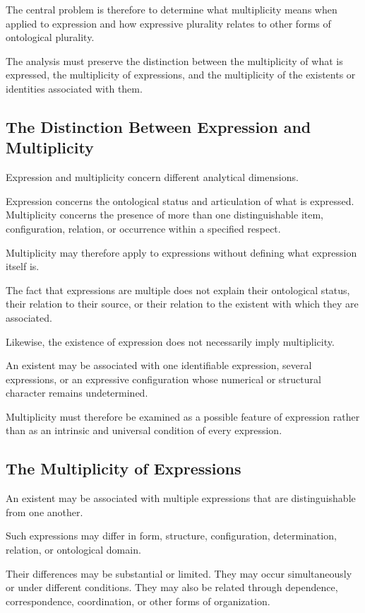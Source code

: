 The central problem is therefore to determine
what multiplicity means when applied to expression
and how expressive plurality relates to other
forms of ontological plurality.

The analysis must preserve the distinction between
the multiplicity of what is expressed, the multiplicity
of expressions, and the multiplicity of the existents
or identities associated with them.

\subsection{The Distinction Between Expression and Multiplicity}

Expression and multiplicity concern different
analytical dimensions.

Expression concerns the ontological status and
articulation of what is expressed. Multiplicity
concerns the presence of more than one distinguishable
item, configuration, relation, or occurrence
within a specified respect.

Multiplicity may therefore apply to expressions
without defining what expression itself is.

The fact that expressions are multiple does not
explain their ontological status, their relation
to their source, or their relation to the existent
with which they are associated.

Likewise, the existence of expression does not
necessarily imply multiplicity.

An existent may be associated with one identifiable
expression, several expressions, or an expressive
configuration whose numerical or structural
character remains undetermined.

Multiplicity must therefore be examined as
a possible feature of expression rather than
as an intrinsic and universal condition of
every expression.

\subsection{The Multiplicity of Expressions}

An existent may be associated with multiple
expressions that are distinguishable from one
another.

Such expressions may differ in form, structure,
configuration, determination, relation, or
ontological domain.

Their differences may be substantial or limited.
They may occur simultaneously or under different
conditions. They may also be related through
dependence, correspondence, coordination,
or other forms of organization.

